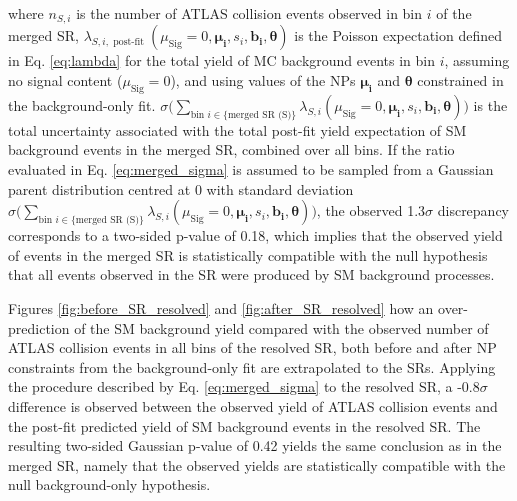 where \(n_{S,i}\) is the number of ATLAS collision events observed in bin \(i\) of the merged SR, \(\lambda_{S,i, \text{ post-fit }}(\mu_\text{Sig}=0, \boldsymbol{\mu_i}, s_i, \boldsymbol{b_i}, \boldsymbol{\theta})\) is the Poisson expectation defined in Eq. \ref{eq:lambda} for the total yield of MC background events in bin \(i\), assuming no signal content (\(\mu_\text{Sig}=0\)), and using values of the NPs \(\boldsymbol{\mu_i}\) and \(\boldsymbol{\theta}\) constrained in the background-only fit. \(\sigma\Big(\sum_{\text{bin }i\in\{\text{merged SR (S)}\}} \lambda_{S,i}(\mu_\text{Sig}=0, \boldsymbol{\mu_i}, s_i, \boldsymbol{b_i}, \boldsymbol{\theta}) \Big)\) is the total  uncertainty associated with the total post-fit yield expectation of SM background events in the merged SR, combined over all bins. If the ratio evaluated in Eq. \ref{eq:merged_sigma} is assumed to be sampled from a Gaussian parent distribution centred at 0 with standard deviation \(\sigma\Big(\sum_{\text{bin }i\in\{\text{merged SR (S)}\}} \lambda_{S,i}(\mu_\text{Sig}=0, \boldsymbol{\mu_i}, s_i, \boldsymbol{b_i}, \boldsymbol{\theta}) \Big)\), the observed 1.3\(\sigma\) discrepancy corresponds to a two-sided p-value \cite{Stats_2003} of 0.18, which implies that the observed yield of events in the merged SR is statistically compatible with the null hypothesis that all events observed in the SR were produced by SM background processes. 

Figures \ref{fig:before_SR_resolved} and \ref{fig:after_SR_resolved} how an over-prediction of the SM background yield compared with the observed number of ATLAS collision events in all bins of the resolved SR, both before and after NP constraints from the background-only fit are extrapolated to the SRs. Applying the procedure described by Eq. \ref{eq:merged_sigma} to the resolved SR, a -0.8\(\sigma\) difference is observed between the observed yield of ATLAS collision events and the post-fit predicted yield of SM background events in the resolved SR. The resulting two-sided Gaussian p-value of 0.42 yields the same conclusion as in the merged SR, namely that the observed yields are statistically compatible with the null background-only hypothesis. 


